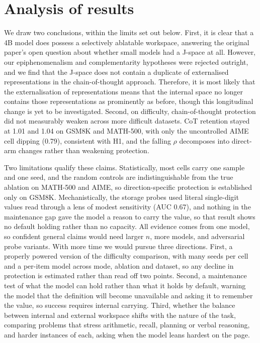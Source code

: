 \documentclass[10pt,a4paper]{article}
\begin{document}
\section{Analysis of results}
We draw two conclusions, within the limits set out below. First, it is clear that a 4B model does possess a
selectively ablatable workspace, answering the original paper's open question about whether small
models had a J-space at all.
However, our epiphenomenalism and complementarity hypotheses were rejected outright, and we find that the J-space does not contain a duplicate of externalised representations in the chain-of-thought approach. Therefore, it is most likely that the externalisation of representations means that the internal space no longer contains those representations as prominently as before, though this longitudinal change is yet to be investigated.
Second, on difficulty,
chain-of-thought protection did not measurably weaken across more difficult datasets. CoT retention stayed at 1.01 and
1.04 on GSM8K and MATH-500, with only the uncontrolled AIME cell dipping (0.79),
consistent with H1, and the falling $\rho$ decomposes into direct-arm changes rather
than weakening protection.

Two limitations qualify these claims. Statistically, most cells carry one sample and one
seed, and the random controls are indistinguishable from the true ablation on MATH-500
and AIME, so direction-specific protection is established only on GSM8K. Mechanistically, the storage
probes used literal single-digit values read through a lens of modest sensitivity (AUC
0.67), and nothing in the maintenance gap gave the model a reason to carry the value,
so that result shows no default holding rather
than no capacity. All
evidence comes from one model, so confident general claims would need larger $n$, more
models, and adversarial probe variants. With more time we would pursue three directions. First, a properly powered version of
the difficulty comparison, with many seeds per cell and a per-item model across mode,
ablation and dataset, so any decline in protection is estimated rather than read off
two points. Second, a maintenance test of what the model can hold rather than what
it holds by default, warning the model that the definition will become unavailable and
asking it to remember the value, so success requires internal carrying. Third, whether the balance between internal and external
workspace shifts with the nature of the task, comparing problems that stress arithmetic, recall,
planning or verbal reasoning, and harder instances of each, asking when the model leans
hardest on the page.
\end{document}
